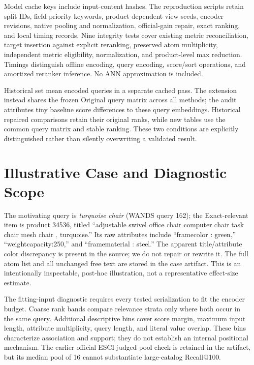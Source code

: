 Model cache keys include input-content hashes. The reproduction scripts retain split IDs, field-priority keywords, product-dependent view seeds, encoder revisions, native pooling and normalization, official-gain repair, exact ranking, and local timing records. Nine integrity tests cover existing metric reconciliation, target insertion against explicit reranking, preserved atom multiplicity, independent metric eligibility, normalization, and product-level max reduction. Timings distinguish offline encoding, query encoding, score/sort operations, and amortized reranker inference. No ANN approximation is included.

Historical set mean encoded queries in a separate cached pass. The extension instead shares the frozen Original query matrix across all methods; the audit attributes tiny baseline score differences to these query embeddings. Historical repaired comparisons retain their original ranks, while new tables use the common query matrix and stable ranking. These two conditions are explicitly distinguished rather than silently overwriting a validated result.

\section{Illustrative Case and Diagnostic Scope}
The motivating query is \emph{turquoise chair} (WANDS query 162); the Exact-relevant item is product 34536, titled ``adjustable swivel office chair computer chair task chair mesh chair , turquoise.'' Its raw attributes include ``framecolor : green,'' ``weightcapacity:250,'' and ``framematerial : steel.'' The apparent title/attribute color discrepancy is present in the source; we do not repair or rewrite it. The full atom list and all unchanged free text are stored in the case artifact. This is an intentionally inspectable, post-hoc illustration, not a representative effect-size estimate.


The fitting-input diagnostic requires every tested serialization to fit the encoder budget. Coarse rank bands compare relevance strata only where both occur in the same query. Additional descriptive bins cover score margin, maximum input length, attribute multiplicity, query length, and literal value overlap. These bins characterize association and support; they do not establish an internal positional mechanism. The earlier official ESCI judged-pool check is retained in the artifact, but its median pool of 16 cannot substantiate large-catalog Recall@100.
